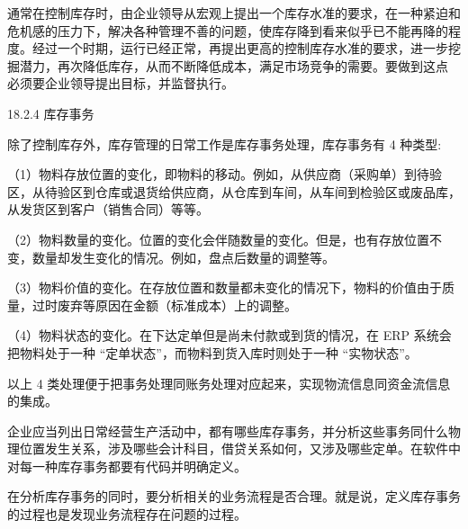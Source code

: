     通常在控制库存时，由企业领导从宏观上提出一个库存水准的要求，在一种紧迫和危机感的压力下，解决各种管理不善的问题，使库存降到看来似乎已不能再降的程度。经过一个时期，运行已经正常，再提出更高的控制库存水准的要求，进一步挖掘潜力，再次降低库存，从而不断降低成本，满足市场竞争的需要。要做到这点 必须要企业领导提出目标，并监督执行。

18.2.4 库存事务

    除了控制库存外，库存管理的日常工作是库存事务处理，库存事务有 4 种类型:

    （1）物料存放位置的变化，即物料的移动。例如，从供应商（采购单）到待验区，从待验区到仓库或退货给供应商，从仓库到车间，从车间到检验区或废品库，从发货区到客户（销售合同）等等。

    （2）物料数量的变化。位置的变化会伴随数量的变化。但是，也有存放位置不变，数量却发生变化的情况。例如，盘点后数量的调整等。

    （3）物料价值的变化。在存放位置和数量都未变化的情况下，物料的价值由于质量，过时废弃等原因在金额（标准成本）上的调整。

    （4）物料状态的变化。在下达定单但是尚未付款或到货的情况，在 ERP 系统会把物料处于一种 “定单状态”，而物料到货入库时则处于一种 “实物状态”。

    以上 4 类处理便于把事务处理同账务处理对应起来，实现物流信息同资金流信息的集成。

    企业应当列出日常经营生产活动中，都有哪些库存事务，并分析这些事务同什么物理位置发生关系，涉及哪些会计科目，借贷关系如何，又涉及哪些定单。在软件中对每一种库存事务都要有代码并明确定义。

    在分析库存事务的同时，要分析相关的业务流程是否合理。就是说，定义库存事务的过程也是发现业务流程存在问题的过程。
